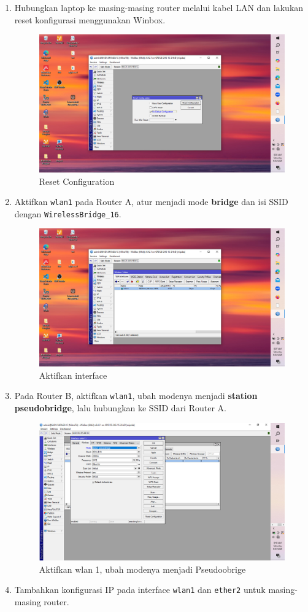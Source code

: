 \begin{enumerate}
    \item Hubungkan laptop ke masing-masing router melalui kabel LAN dan lakukan reset konfigurasi menggunakan Winbox.
    \begin{figure}[H]
        \centering
        \includegraphics[width=0.5\linewidth]{P1/img/1.jpeg}
        \caption{Reset Configuration}
        \label{fig:gambar4}
    \end{figure}
    \item Aktifkan \texttt{wlan1} pada Router A, atur menjadi mode \textbf{bridge} dan isi SSID dengan \texttt{WirelessBridge\_16}.
    \begin{figure}[H]
        \centering
        \includegraphics[width=0.5\linewidth]{P1/img/3.jpeg}
        \caption{Aktifkan interface}
        \label{fig:gambar4}
    \end{figure}
    \item Pada Router B, aktifkan \texttt{wlan1}, ubah modenya menjadi \textbf{station pseudobridge}, lalu hubungkan ke SSID dari Router A.
    \begin{figure}[H]
        \centering
        \includegraphics[width=0.5\linewidth]{P1/img/17.jpeg}
        \caption{Aktifkan wlan 1, ubah modenya menjadi Pseudoobrige}
        \label{fig:gambar4}
    \end{figure}
    \item Tambahkan konfigurasi IP pada interface \texttt{wlan1} dan \texttt{ether2} untuk masing-masing router.

\end{enumerate}
